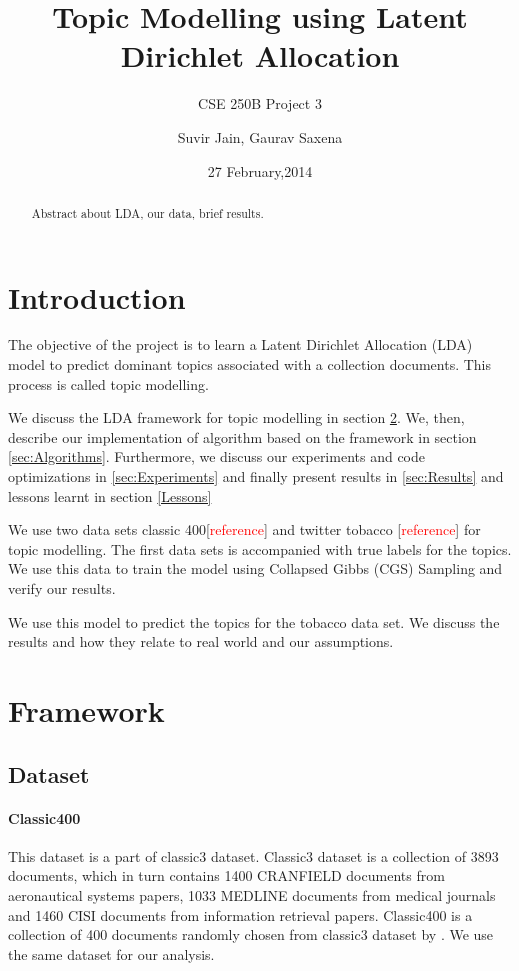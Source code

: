 \documentclass[11pt,a4paper,oneside]{article}
\title{Topic Modelling using Latent Dirichlet Allocation}
\subtitle{CSE 250B Project 3}
\author{Suvir Jain, Gaurav Saxena}
\date{27 February,2014}
\def\red{\textcolor{red}}
\begin{document}
\maketitle

\begin{abstract}
Abstract about LDA, our data, brief results.
\end{abstract}

\section{Introduction}

The objective of the project is to learn a Latent Dirichlet Allocation (LDA) model to predict dominant topics associated with a collection documents. This process is called topic modelling.

We discuss the LDA framework for topic modelling in section \ref{sec:Framework}. We, then, describe our implementation of algorithm based on the framework in section \ref{sec:Algorithms}. Furthermore, we discuss our experiments and code optimizations in \ref{sec:Experiments} and finally present results in \ref{sec:Results} and lessons learnt in section \ref{Lessons}

We use two data sets classic 400[\red{reference}] and twitter tobacco [\red{reference}] for topic modelling. The first data sets is accompanied with true labels for the topics. We use this data to train the model using Collapsed Gibbs (CGS) Sampling and verify our results.

We use this model to predict the topics for the tobacco data set. We discuss the results and how they relate to real world and our assumptions.

\section{Framework}
\label{sec:Framework}

\subsection{Dataset}

\paragraph{Classic400}

This dataset is a part of classic3\cite{banerjee2005clustering} dataset. Classic3 dataset is a collection of 3893 documents, which in turn contains 1400 CRANFIELD documents from aeronautical systems papers, 1033 MEDLINE documents from medical journals and 1460 CISI documents from information retrieval papers. Classic400 is a collection of 400 documents randomly chosen from classic3 dataset by \cite{banerjee2005clustering}. We use the same dataset for our analysis.
\end{document}
